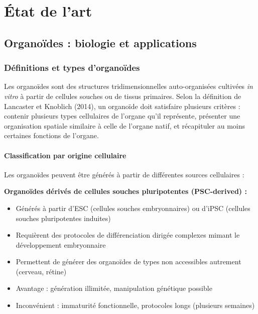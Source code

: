 
\chapter{État de l'art}

\section{Organoïdes : biologie et applications}

\subsection{Définitions et types d'organoïdes}

Les organoïdes sont des structures tridimensionnelles auto-organisées cultivées \textit{in vitro} à partir de cellules souches ou de tissus primaires. Selon la définition de Lancaster et Knoblich (2014), un organoïde doit satisfaire plusieurs critères : contenir plusieurs types cellulaires de l'organe qu'il représente, présenter une organisation spatiale similaire à celle de l'organe natif, et récapituler au moins certaines fonctions de l'organe.

\subsubsection{Classification par origine cellulaire}

Les organoïdes peuvent être générés à partir de différentes sources cellulaires :

\textbf{Organoïdes dérivés de cellules souches pluripotentes (PSC-derived) :}
\begin{itemize}
    \item Générés à partir d'ESC (cellules souches embryonnaires) ou d'iPSC (cellules souches pluripotentes induites)
    \item Requièrent des protocoles de différenciation dirigée complexes mimant le développement embryonnaire
    \item Permettent de générer des organoïdes de types non accessibles autrement (cerveau, rétine)
    \item Avantage : génération illimitée, manipulation génétique possible
    \item Inconvénient : immaturité fonctionnelle, protocoles longs (plusieurs semaines)
\end{itemize}

